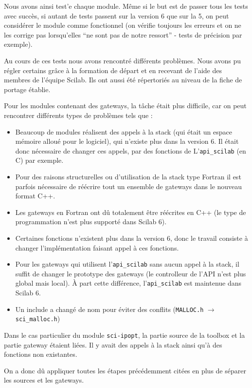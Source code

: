 Nous avons ainsi test'e chaque module.
Même si le but est de passer tous les tests avec succès,
si autant de tests passent sur la version 6 que sur la 5,
on peut considérer le module comme fonctionnel
(on vérifie toujours les erreurs et on ne les corrige pas
lorsqu’elles “ne sont pas de notre ressort” - tests de précision
par exemple).

Au cours de ces tests nous avons rencontré différents problèmes.
Nous avons pu régler certains grâce à la formation de départ
et en recevant de l’aide des membres de l'équipe Scilab.
Ils ont aussi été répertoriés au niveau de la fiche de portage établie.

Pour les modules contenant des gateways, la t\^ache était plus difficile,
car on peut rencontrer différents types de problèmes tels que :

\begin{itemize}
    \item Beaucoup de modules réalisent des appels à la stack
        (qui était un espace mémoire alloué pour le logiciel),
        qui n’existe plus dans la version 6.
        Il était donc nécessaire de changer ces appels,
        par des fonctions de L’{\tt api\_scilab} (en C) par exemple.
    \item Pour des raisons structurelles ou d’utilisation de la stack
        type Fortran il est parfois nécessaire de réécrire tout un ensemble
        de gateways dans le nouveau format C++.
    \item Les gateways en Fortran ont d\^u totalement \^etre r\'e\'ecrites
        en C++ (le type de programmation n'est plus support\'e dans
        Scilab 6).
    \item Certaines fonctions n’existent plus dans la version 6,
        donc le travail consiste à changer l’implémentation
        faisant appel à ces fonctions.
    \item Pour les gateways qui utilisent l’{\tt api\_scilab} sans aucun appel
        à la stack, il suffit de changer le prototype des gateways
        (le controlleur de l’API n’est plus global mais local).
        \`A part cette diff\'erence, l'{\tt api\_scilab} est maintenue
        dans Scilab 6.
    \item Un include a chang\'e de nom pour éviter des conflits
        ({\tt MALLOC.h} $\rightarrow$ {\tt sci\_malloc.h})
\end{itemize}

Dans le cas particulier du module {\tt sci-ipopt},
la partie source de la toolbox et la partie gateway étaient liées.
Il y avait des appels à la stack ainsi qu'\`a des fonctions non
existantes.

On a donc d\^u appliquer toutes les étapes précédemment citées
en plus de séparer les sources et les gateways.

